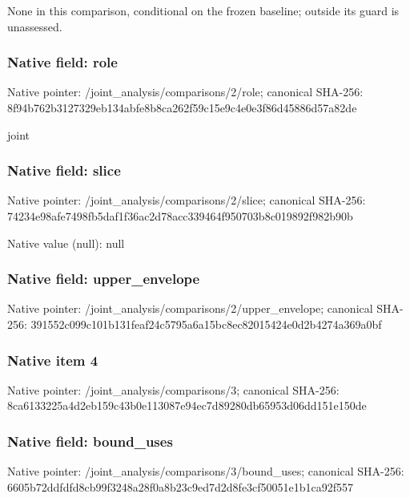 \documentclass[10pt,a4paper]{article}
\begin{document}
\begingroup\raggedright\sloppy None in this comparison,\allowbreak{} conditional on the frozen baseline;\allowbreak{} outside its guard is unassessed.\par\endgroup

\subsubsection{Native field: role}
Native pointer: /joint\_\allowbreak{}analysis/comparisons/2/role; canonical SHA-256: 8f94b762b3127329eb134abfe8b8ca262f59c15e9c4e0e3f86d45886d57a82de

\begingroup\raggedright\sloppy joint\par\endgroup

\subsubsection{Native field: slice}
Native pointer: /joint\_\allowbreak{}analysis/comparisons/2/slice; canonical SHA-256: 74234e98afe7498fb5daf1f36ac2d78acc339464f950703b8c019892f982b90b

Native value (null): null

\subsubsection{Native field: upper\_\allowbreak{}envelope}
Native pointer: /joint\_\allowbreak{}analysis/comparisons/2/upper\_\allowbreak{}envelope; canonical SHA-256: 391552c099c101b131feaf24c5795a6a15bc8ec82015424e0d2b4274a369a0bf

\begingroup\raggedright{}\par\endgroup

\subsubsection{Native item 4}
Native pointer: /joint\_\allowbreak{}analysis/comparisons/3; canonical SHA-256: 8ca6133225a4d2eb159c43b0e113087e94ec7d89280db65953d06dd151e150de

\subsubsection{Native field: bound\_\allowbreak{}uses}
Native pointer: /joint\_\allowbreak{}analysis/comparisons/3/bound\_\allowbreak{}uses; canonical SHA-256: 6605b72ddfdfd8cb99f3248a28f0a8b23c9ed7d2d8fe3cf50051e1b1ca92f557
\end{document}
